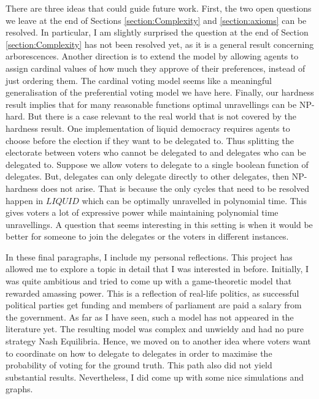 \documentclass[11pt,a4paper, titlepage]{article}
\theoremstyle{definition}
\newcommand{\LIQUID}{\mathit{LIQUID}}
\begin{document}
There are three ideas that could guide future work. First, the two open questions we leave at the end of Sections \ref{section:Complexity} and \ref{section:axioms} can be resolved. In particular, I am slightly surprised the question at the end of Section \ref{section:Complexity} has not been resolved yet, as it is a general result concerning arborescences.
Another direction is to extend the model by allowing agents to assign cardinal values of how much they approve of their preferences, instead of just ordering them.
The cardinal voting model seems like a meaningful generalisation of the preferential voting model we have here.
Finally, our hardness result implies that for many reasonable functions optimal unravellings can be NP-hard.
But there is a case relevant to the real world that is not covered by the hardness result.
One implementation of liquid democracy requires agents to choose before the election if they want to be delegated to.
Thus splitting the electorate between voters who cannot be delegated to and delegates who can be delegated to. 
Suppose we allow voters to delegate to a single boolean function of delegates. 
But, delegates can only delegate directly to other delegates, then NP-hardness does not arise.
That is because the only cycles that need to be resolved happen in $\LIQUID$ which can be optimally unravelled in polynomial time.
This gives voters a lot of expressive power while maintaining polynomial time unravellings. 
A question that seems interesting in this setting is when it would be better for someone to join the delegates or the voters in different instances.

In these final paragraphs, I include my personal reflections.
This project has allowed me to explore a topic in detail that I was interested in before.
Initially, I was quite ambitious and tried to come up with a game-theoretic model that rewarded amassing power.
This is a reflection of real-life politics, as successful political parties get funding and members of parliament are paid a salary from the government.
As far as I have seen, such a model has not appeared in the literature yet.
The resulting model was complex and unwieldy and had no pure strategy Nash Equilibria.
Hence, we moved on to another idea where voters want to coordinate on how to delegate to delegates in order to maximise the probability of voting for the ground truth.
This path also did not yield substantial results. Nevertheless, I did come up with some nice simulations and graphs.
\end{document}
